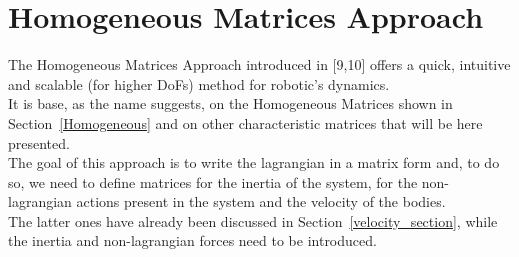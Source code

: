 \documentclass[a4paper,12pt,oneside]{report}
\begin{document}
\section{Homogeneous Matrices Approach}
The Homogeneous Matrices Approach introduced in [9,10] offers a quick, intuitive and scalable (for higher DoFs) method for robotic's dynamics.\\
It is base, as the name suggests, on the Homogeneous Matrices shown in Section~\ref{Homogeneous} and on other characteristic matrices that will be here presented.\\
The goal of this approach is to write the lagrangian in a matrix form and, to do so, we need to define matrices for the inertia of the system, for the non-lagrangian actions present in the system and the velocity of the bodies.\\
The latter ones have already been discussed in Section~\ref{velocity_section}, while the inertia and non-lagrangian forces need to be introduced.\\
\end{document}
